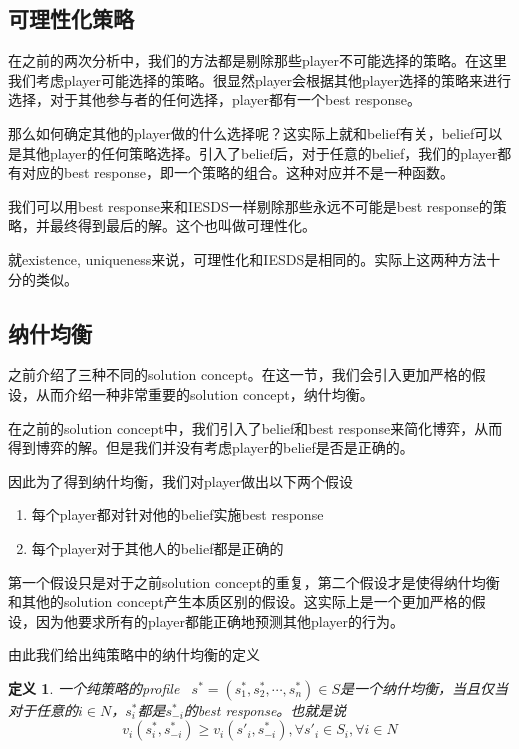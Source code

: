 \documentclass[UTF8,12pt]{ctexart}
\newtheorem{Def}{定义}[section]
\numberwithin{equation}{section} %
\numberwithin{figure}{section}
\numberwithin{table}{section}
\begin{document}
	\subsection{可理性化策略}
	在之前的两次分析中，我们的方法都是剔除那些player不可能选择的策略。在这里我们考虑player可能选择的策略。很显然player会根据其他player选择的策略来进行选择，对于其他参与者的任何选择，player都有一个best response。
	
	那么如何确定其他的player做的什么选择呢？这实际上就和belief有关，belief可以是其他player的任何策略选择。引入了belief后，对于任意的belief，我们的player都有对应的best response，即一个策略的组合。这种对应并不是一种函数。
	
	我们可以用best response来和IESDS一样剔除那些永远不可能是best response的策略，并最终得到最后的解。这个也叫做可理性化。
	
	就existence, uniqueness来说，可理性化和IESDS是相同的。实际上这两种方法十分的类似。
	
	\subsection{纳什均衡}
	之前介绍了三种不同的solution concept。在这一节，我们会引入更加严格的假设，从而介绍一种非常重要的solution concept，纳什均衡。
	
	在之前的solution concept中，我们引入了belief和best response来简化博弈，从而得到博弈的解。但是我们并没有考虑player的belief是否是正确的。
	
	因此为了得到纳什均衡，我们对player做出以下两个假设
	\begin{enumerate}
		\item 每个player都对针对他的belief实施best response
		
		\item 每个player对于其他人的belief都是正确的
	\end{enumerate}
	第一个假设只是对于之前solution concept的重复，第二个假设才是使得纳什均衡和其他的solution concept产生本质区别的假设。这实际上是一个更加严格的假设，因为他要求所有的player都能正确地预测其他player的行为。
	
	由此我们给出纯策略中的纳什均衡的定义
	\begin{Def}
		一个纯策略的profile \ $s^* = (s^*_1,s^*_2,\cdots,s^*_n) \in S$是一个纳什均衡，当且仅当对于任意的$i \in N$，$s^*_i$都是$s^*_{-i}$的best response。也就是说
		\begin{equation}
			v_i(s^*_i,s^*_{-i}) \geqslant v_i(s'_i,s^*_{-i}) ,\forall s'_i \in S_i,\forall i \in N			
		\end{equation}
	\end{Def}
	
\end{document}
